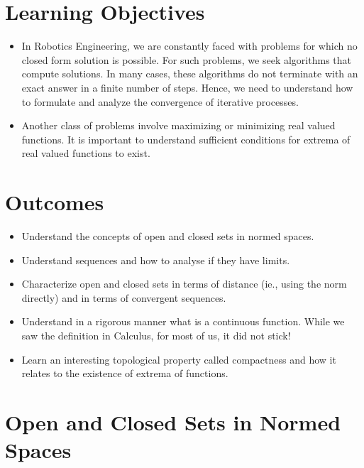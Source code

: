 \section*{Learning Objectives}

\begin{itemize}
\item In Robotics Engineering, we are constantly faced with problems for which no closed form solution is possible. For such problems, we seek algorithms that compute solutions. In many cases, these algorithms do not terminate with an exact answer in  a finite number of steps. Hence, we need to understand how to formulate and analyze the convergence of iterative processes. 

\item Another class of problems involve maximizing or minimizing real valued functions. It is important to understand sufficient conditions for extrema of real valued functions to exist.


\end{itemize}

\section*{Outcomes} 
\begin{itemize}
\item  Understand the concepts of open and closed sets in normed spaces.
\item Understand sequences and how to analyse if they have limits.
\item Characterize open and closed sets in terms of distance (ie., using the norm directly) and in terms of convergent sequences.
\item Understand in a rigorous manner what is a continuous function. While we saw the definition in Calculus, for most of us, it did not stick!
\item Learn an interesting topological property called compactness and how it relates to the existence of extrema of functions.
\end{itemize}

\newpage



\section{Open and Closed Sets in Normed Spaces} 

